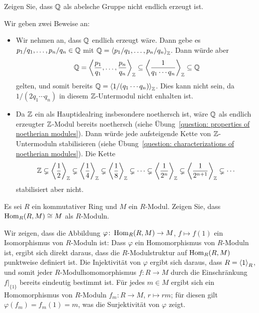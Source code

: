 \begin{question}
  \label{question: Q is not finitely generated}
  Zeigen Sie, dass $\mathbb{Q}$ als abelsche Gruppe nicht endlich erzeugt ist.
\end{question}


\begin{solution}
  Wir geben zwei Beweise an:
  \begin{itemize}
    \item
      Wir nehmen an, dass $\mathbb{Q}$ endlich erzeugt wäre.
      Dann gebe es $p_1/q_1, \dotsc, p_n/q_n \in \mathbb{Q}$ mit $\mathbb{Q} = \left\langle p_1/q_1, \dotsc, p_n/q_n \right\rangle_{\mathbb{Z}}$.
      Dann würde aber
      \[
                  \mathbb{Q}
        =         \left\langle  \frac{p_1}{q_1}, \dotsc, \frac{p_n}{q_n}  \right\rangle_{\mathbb{Z}}
        \subseteq \left\langle \frac{1}{q_1 \dotsm q_n} \right\rangle_{\mathbb{Z}}
        \subseteq \mathbb{Q}
      \]
      gelten, und somit bereits $\mathbb{Q} = \left\langle 1/(q_1 \dotsm q_n) \right\rangle_{\mathbb{Z}}$.
      Dies kann nicht sein, da $1/(2 q_1 \dotsm q_n)$ in diesem $\mathbb{Z}$-Untermodul nicht enhalten ist.
      
    \item
      Da $\mathbb{Z}$ ein als Hauptidealring insbesondere noethersch ist, wäre $\mathbb{Q}$ als endlich erzeugter $\mathbb{Z}$-Modul bereits noethersch (siehe Übung~\ref{question: properties of noetherian modules}).
      Dann würde jede aufsteigende Kette von $\mathbb{Z}$-Untermoduln stabilisieren (siehe Übung~\ref{question: characterizations of noetherian modules}).
      Die Kette
      \[
                    \mathbb{Z}
        \subsetneq  \left\langle \frac{1}{2} \right\rangle_{\mathbb{Z}}
        \subsetneq  \left\langle \frac{1}{4} \right\rangle_{\mathbb{Z}}
        \subsetneq  \left\langle \frac{1}{8} \right\rangle_{\mathbb{Z}}
        \subsetneq  \dotsb
        \subsetneq  \left\langle \frac{1}{2^n} \right\rangle_{\mathbb{Z}}
        \subsetneq  \left\langle \frac{1}{2^{n+1}} \right\rangle_{\mathbb{Z}}
        \subsetneq  \dotsb
      \]
      stabilisiert aber nicht.
  \end{itemize}
\end{solution}


\begin{question}
  Es sei $R$ ein kommutativer Ring und $M$ ein $R$-Modul.
  Zeigen Sie, dass $\operatorname{Hom}_R(R, M) \cong M$ als $R$-Moduln.
\end{question}


\begin{solution}
  Wir zeigen, dass die Abbildung $\varphi \colon \operatorname{Hom}_R(R, M) \to M$, $f \mapsto f(1)$ ein Isomorphismus von $R$-Moduln ist:
  Dass $\varphi$ ein Homomorphismus von $R$-Moduln ist, ergibt sich direkt daraus, dass die $R$-Modulstruktur auf $\operatorname{Hom}_R(R, M)$ punktweise definiert ist.
  Die Injektivität von $\varphi$ ergibt sich daraus, dass $R = \left\langle 1 \right\rangle_R$, und somit jeder $R$-Modulhomomorphismus $f \colon R \to M$ durch die Einschränkung $f|_{\{1\}}$ bereits eindeutig bestimmt ist.
  Für jedes $m \in M$ ergibt sich ein Homomorphismus von $R$-Moduln $f_m \colon R \to M$, $r \mapsto rm$;
  für diesen gilt $\varphi(f_m) = f_m(1) = m$, was die Surjektivität von $\varphi$ zeigt.
\end{solution}


